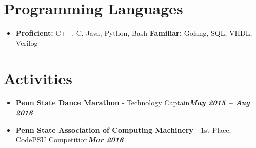 \documentclass[letterpaper,11pt]{article}
\newcommand{\resumeItemWithDate}[2]{
  \item[]\small{
    {#1}\hfill\textit{#2}\vspace{-6pt}
  }
}
\newcommand{\resumeSubHeadingListStart}{\begin{itemize}[leftmargin=*]}
\newcommand{\resumeSubHeadingListEnd}{\end{itemize}}
\begin{document}
%
\section{Programming Languages}
 \resumeSubHeadingListStart
   \item[]{
     \textbf{Proficient:}{ C++, C, Java, Python, Bash}
     \hfill
     \textbf{Familiar:}{ Golang, SQL, VHDL, Verilog }
   }
 \resumeSubHeadingListEnd
 
\section{Activities}
 \resumeSubHeadingListStart
    \resumeItemWithDate{\textbf{Penn State Dance Marathon} - Technology Captain}{\textbf{May 2015 -- Aug 2016}}
    \resumeItemWithDate{\textbf{Penn State Association of Computing Machinery} - 1st Place, CodePSU Competition}{\textbf{Mar 2016}}
 \resumeSubHeadingListEnd
\end{document}
